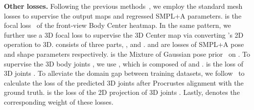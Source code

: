 \documentclass[10pt,twocolumn,letterpaper]{article}
\begin{document}
\textbf{Other losses.}
Following the previous methods~\cite{romp,hmr}, we employ the standard mesh losses to supervise the output maps and regressed SMPL+A parameters. 
 is the focal loss~\cite{romp} of the front-view Body Center heatmap.
In the same pattern, we further use a 3D focal loss  to supervise the 3D Center map via converting 's 2D operation to 3D. 
 consists of three parts, , and .
 and  are  losses of SMPL+A pose  and shape  parameters respectively.
 is the Mixture of Gaussian pose prior~\cite{keep,smpl} on .
To supervise the 3D body joints , we use , which is composed of  and .
 is the  loss of 3D joints .
To alleviate the domain gap between training datasets, we follow~\cite{romp,sun2019dsd-satn} to calculate the  loss  of the predicted 3D joints after Procrustes alignment with the ground truth.
 is the  loss of the 2D projection of 3D joints .
Lastly,  denotes the corresponding weight of these losses.
\end{document}

